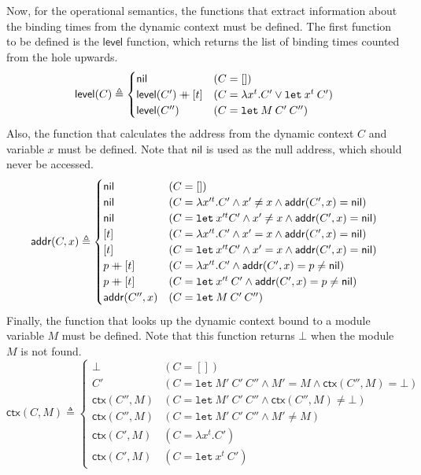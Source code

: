 \documentclass{article}
\newcommand*{\addr}{\mathsf{addr}}
\newcommand*{\level}{\mathsf{level}}
\newcommand*{\modctx}{\mathsf{ctx}}
\newcommand*{\mdoubleplus}{\ensuremath{\mathbin{+\mkern-10mu+}}}
\begin{document}
Now, for the operational semantics, the functions that extract information about the binding times from the dynamic context must be defined.
The first function to be defined is the $\level$ function, which returns the list of binding times counted from the hole upwards.
\[
  \level(C) \triangleq
  \begin{cases}
    \mathsf{nil}              & (C=[])                                           \\
    \level(C')\mdoubleplus[t] & (C=\lambda x^{t}.C'\lor \mathtt{let\:}x^{t}\:C') \\
    \level(C'')               & (C=\mathtt{let}\:M\:C'\:C'')
  \end{cases}
\]
Also, the function that calculates the address from the dynamic context $C$ and variable $x$ must be defined.
Note that $\mathsf{nil}$ is used as the null address, which should never be accessed.
\[
  \addr(C,x)\triangleq
  \begin{cases}
    \mathsf{nil}       & (C=[])                                                                   \\
    \mathsf{nil}       & (C=\lambda x'^{t}.C'\wedge x'\neq x\wedge \addr(C',x)=\mathsf{nil})      \\
    \mathsf{nil}       & (C=\mathtt{let}\:x'^{t}C'\wedge x'\neq x\wedge \addr(C',x)=\mathsf{nil}) \\
    [t]                & (C=\lambda x'^{t}.C'\wedge x'= x\wedge \addr(C',x)=\mathsf{nil})         \\
    [t]                & (C=\mathtt{let}\:x'^{t}C'\wedge x'= x\wedge \addr(C',x)=\mathsf{nil})    \\
    p \mdoubleplus [t] & (C=\lambda x'^{t}.C'\wedge \addr(C',x)=p\neq\mathsf{nil})                \\
    p \mdoubleplus [t] & (C=\mathtt{let}\:x'^{t}\:C'\wedge \addr(C',x)=p\neq\mathsf{nil})         \\
    \addr(C'',x)       & (C=\mathtt{let}\:M\:C'\:C'')
  \end{cases}
\]
Finally, the function that looks up the dynamic context bound to a module variable $M$ must be defined.
Note that this function returns $\bot$ when the module $M$ is not found.
\[
  \modctx(C,M)\triangleq
  \begin{cases}
    \bot           & (C=[])                                                             \\
    C'             & (C=\mathtt{let}\:M'\:C'\:C''\wedge M'= M\wedge\modctx(C'',M)=\bot) \\
    \modctx(C'',M) & (C=\mathtt{let}\:M'\:C'\:C''\wedge\modctx(C'',M)\neq\bot)          \\
    \modctx(C'',M) & (C=\mathtt{let}\:M'\:C'\:C''\wedge M'\neq M)                       \\
    \modctx(C',M)  & (C=\lambda x^{t}.C')                                               \\
    \modctx(C',M)  & (C=\mathtt{let}\:x^{t}\:C')
  \end{cases}
\]
\end{document}
